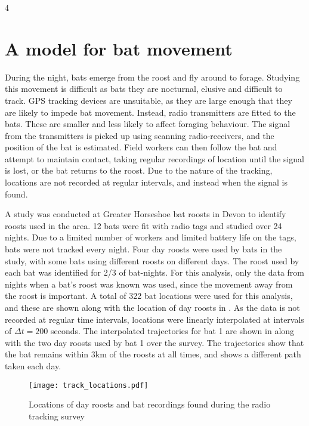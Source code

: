 4
\section{A model for bat movement}

During the night, bats emerge from the roost and fly around to forage. Studying this movement is difficult as bats they are nocturnal, elusive and difficult to track. GPS tracking devices are unsuitable, as they are large enough that they are likely to impede bat movement. Instead, radio transmitters are fitted to the bats. These are smaller and less likely to affect foraging behaviour. The signal from the transmitters is picked up using scanning radio-receivers, and the position of the bat is estimated. Field workers can then follow the bat and attempt to maintain contact, taking regular recordings of location until the signal is lost, or the bat returns to the roost. Due to the nature of the tracking, locations are not recorded at regular intervals, and instead when the signal is found.

A study was conducted at Greater Horseshoe bat roosts in Devon to identify roosts used in the area. 12 bats were fit with radio tags and studied over 24 nights. Due to a limited number of workers and limited battery life on the tags, bats were not tracked every night. Four day roosts were used by bats in the study, with some bats using different roosts on different days. The roost used by each bat was identified for 2/3 of bat-nights. For this analysis, only  the data from nights when a bat's roost was known was used, since the movement away from the roost is important. A total of 322 bat locations were used for this analysis, and these are shown along with the location of day roosts in . As the data is not recorded at regular time intervals, locations were linearly interpolated at intervals of $\Delta t = 200$ seconds. The interpolated trajectories for bat 1 are shown in  along with the two day roosts used by bat 1 over the survey. The trajectories show that the bat remains within 3km of the roosts at all times, and shows a different path taken each day.


\begin{figure} [h]
    \centering
        \texttt{[image: track\_locations.pdf]}
        \caption{Locations of day roosts and bat recordings found during the radio tracking survey}
    \label{fig:radiotrack_locations}
\end{figure}

